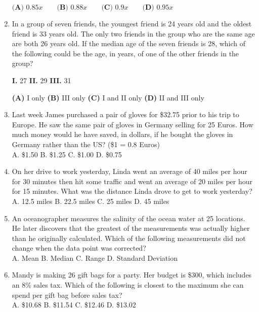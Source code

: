 \documentclass[../satmath.tex]{subfiles}
\begin{document}
\begin{enumerate}[label=\bfseries\arabic*.]
$\textbf{(A) } 0.85x \qquad \textbf{(B) } 0.88x \qquad \textbf{(C) } 0.9x \qquad \textbf{(D) } 0.95x$

\item In a group of seven friends, the youngest friend is 24 years old and the oldest friend is 33 years old. The only two friends in the group who are the 
same age are both 26 years old. If the median age of the seven friends is 28, which of the following could be the age, in years, of one of the other friends 
in the group?

\textbf{I.} 27 \qquad \textbf{II.} 29 \qquad \textbf{III.} 31

\textbf{(A) } I only \qquad \textbf{(B) } III only \textbf{(C) } I and II only \qquad \textbf{(D) } II and III only


\item Last week James purchased a pair of gloves for \$32.75 prior to his trip to Europe. He saw the same pair of gloves in Germany selling for 25 Euros.
How much money would he have saved, in dollars, if he bought the gloves in Germany rather than the US? (\$1 = 0.8 Euros)\\
A. \$1.50 \quad B. \$1.25 \quad C. \$1.00 \quad D. \$0.75

 
\item On her drive to work yesterday, Linda went an average of 40 miles per hour for 30 minutes then hit some traffic and went an average 
of 20 miles per hour for 15 minutes. What was the distance Linda drove to get to work yesterday?\\
A. 12.5 miles \quad B. 22.5 miles \quad C. 25 miles \quad D. 45 miles 

 
\item An oceanographer measures the salinity of the ocean water at 25 locations. He later discovers that the greatest of the measurements was 
actually higher than he originally calculated. Which of the following measurements did not change when the data point was corrected?\\
A. Mean \quad B. Median \quad C. Range \quad D. Standard Deviation 

 
\item Mandy is making 26 gift bags for a party. Her budget is \$300, which includes an 8\% sales tax. Which of the following is closest to the 
maximum she can spend per gift bag before sales tax?\\
A. \$10.68 \quad B. \$11.54 \quad C. \$12.46 \quad D. \$13.02
\medbreak 


\end{enumerate}
\end{document}
